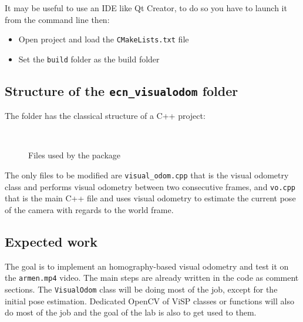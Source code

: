 \documentclass{ecnreport}
\begin{document}
It may be useful to use an IDE like Qt Creator, to do so you have to launch it from the command line then:
\begin{itemize}
 \item Open project and load the \texttt{CMakeLists.txt} file
 \item Set the \texttt{build} folder as the build folder
\end{itemize}
 

\subsection{Structure of the \texttt{ecn\_visualodom} folder}

The folder has the classical structure of a C++ project:
\begin{figure}[h]\centering
\begin{minipage}{.05\linewidth} ~ \end{minipage}
\begin{minipage}{.75\linewidth}
\end{minipage}
\caption{Files used by the package}
\end{figure}

The only files to be modified are \texttt{visual\_odom.cpp} that is the visual odometry class and performs visual odometry between two consecutive frames, and \texttt{vo.cpp} that is the main 
C++ file and uses visual odometry to estimate the current pose of the camera with regards to the world frame.


\subsection{Expected work}

The goal is to implement an homography-based visual odometry and test it on the \texttt{armen.mp4} video.
The main steps are already written in the code as comment sections. The \texttt{VisualOdom} class will be doing most of the job, except for the initial pose estimation. 
Dedicated OpenCV of ViSP classes or functions will also do most of the job and the goal of the lab is also to get used to them.
\end{document}
